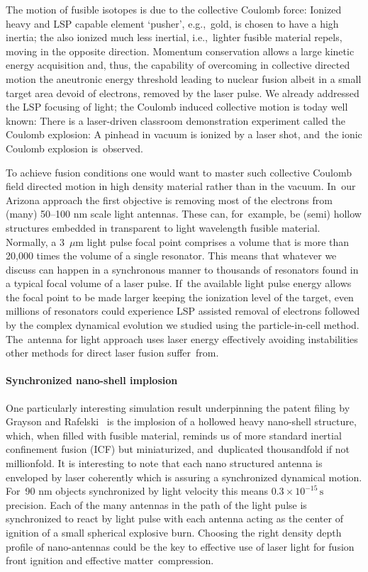 \documentclass[particles,article,accept,pdftex,moreauthors]{Definitions/mdpi}
\begin{document}
The motion of fusible isotopes is due to the collective Coulomb force: Ionized heavy and LSP capable element `pusher', e.g.,~gold, is chosen to have a high inertia; the also ionized much less inertial, i.e.,~lighter fusible material repels, moving in the opposite direction. Momentum conservation allows a large kinetic energy acquisition and, thus, the capability of overcoming in collective directed motion the aneutronic energy threshold leading to nuclear fusion albeit in a small target area devoid of electrons, removed by the laser pulse. We already addressed the LSP focusing of light; the Coulomb induced collective motion is today well known: There is a laser-driven classroom demonstration experiment called the Coulomb explosion: A pinhead in vacuum is ionized by a laser shot, and~the ionic Coulomb explosion is~observed.

To achieve fusion conditions one would want to master such collective Coulomb field directed motion in high density material rather than in the vacuum. In~our Arizona approach the first objective is removing most of the electrons from (many) 50--100 nm scale light antennas. These can, for~example, be (semi) hollow structures embedded in transparent to light wavelength fusible material. Normally, a %
 3~$\mu$m light pulse focal point comprises a volume that is more than 20,000 times the volume of a single resonator. This means that whatever we discuss can happen in a synchronous manner to thousands of resonators found in a typical focal volume of a laser pulse. If~the available light pulse energy allows the focal point to be made larger keeping the ionization level of the target, even millions of resonators could experience LSP assisted removal of electrons followed by the complex dynamical evolution we studied using the particle-in-cell method. The~antenna for light approach uses laser energy effectively avoiding instabilities other methods for direct laser fusion suffer~from. 

\vspace{-6pt}\paragraph*{\bf Synchronized nano-shell implosion}
One particularly interesting simulation result underpinning the patent filing by Grayson and Rafelski~\cite{ChGJR2025patent} is the implosion of a hollowed heavy nano-shell structure, which, when filled with fusible material, reminds us of more standard inertial confinement fusion (ICF) but miniaturized, and~duplicated thousandfold if not millionfold. It is interesting to note that each nano structured antenna is enveloped by laser coherently which is assuring a synchronized dynamical motion. For~90 nm objects synchronized by light velocity this means $ 0.3\times 10^{-15}\,\mathrm{s}$ precision. Each of the many antennas in the path of the light pulse is synchronized to react by light pulse with each antenna acting as the center of ignition of a small spherical explosive burn. Choosing the right density depth profile of nano-antennas could be the key to effective use of laser light for fusion front ignition and effective matter~compression.
\end{document}
